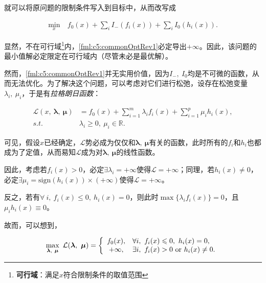 就可以将原问题的限制条件写入到目标中，从而改写成

\begin{equation}\label{fml:c5:commonOptRev1}
	\begin{aligned}
		\min\limits_{x}~&f_0(x)+\sum_{i}{I_-(f_i(x))}+\sum_{i}{I_0(h_i(x))}.
	\end{aligned}
\end{equation}

显然，不在可行域\footnote{\textbf{可行域}：满足$x$符合限制条件的取值范围}内，\eqref{fml:c5:commonOptRev1}必定导出$+\infty$。因此，该问题的最小值解必定限定在可行域内（尽管未必是最优解）。

然而，\eqref{fml:c5:commonOptRev1}并无实用价值，因为$I_-,~I_0$均是不可微的函数，从而无法优化。为了解决这个问题，可以考虑对它们进行松弛，设存在松弛变量$\lambda_i,~\mu_i$，于是有\emph{拉格朗日函数}：

\begin{subequations}
	\renewcommand{\theequation}
	{\theparentequation-\arabic{equation}}
	\begin{align}
		\mathcal{L}(x,~\bm{\lambda},~\bm{\mu})&=f_0(x)+\sum\limits_{i=1}^{m}{\lambda_i f_i(x)}+\sum\limits_{i=1}^{p}{\mu_i h_i(x)}, \label{fml:c5:lagrangeFunc}\\
		s.t.~&\lambda_i \geqslant 0,~\mu_i \in \mathbb{R}.\label{fml:c5:lagrangeFuncConst}
	\end{align}
\end{subequations}

可见，假设$x$已经确定，$\mathcal{L}$势必成为仅仅和$\bm{\lambda},~\bm{\mu}$有关的函数，此时所有的$f_i$和$h_i$也都成为了定值，从而易知$\mathcal{L}$成为对$\bm{\lambda},~\bm{\mu}$的线性函数。

因此，考虑若$f_i(x)>0$，必定$\exists \lambda_i=+\infty$使得$\mathcal{L}=+\infty$；同理，若$h_i(x) \neq 0$，必定$\exists \mu_i=\mathrm{sign}(h_i(x))\times(+\infty)$使得$\mathcal{L}=+\infty$。

反之，若有$\forall~i,~f_i(x) \leqslant 0,~h_i(x)=0$，则此时$\max\{\lambda_i f_i(x)\}=0$，且$\mu_i h_i(x) \equiv 0$。

故而，可以想到，

\begin{equation}\label{fml:c5:maxLUlagrange}
	\max\limits_{\bm{\lambda},~\bm{\mu}}~\mathcal{L}(\bm{\lambda},~\bm{\mu}) = \left\{
	\begin{array}{c    l}
		f_0(x), &\forall i,~f_i(x) \leqslant 0,~h_i(x)=0,\\
		+\infty, &\exists i,~f_i(x)>0~\mathrm{or}~h_i(x) \neq 0.
	\end{array}
	\right.
\end{equation}

